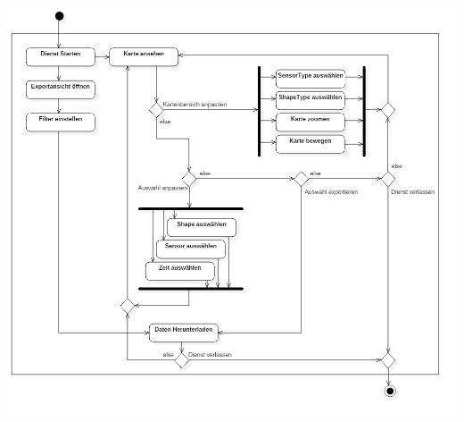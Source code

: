    \subsection{}
        \includegraphics[width=1\linewidth]{diagrams/ActivityDiagram1_Final.png}

        